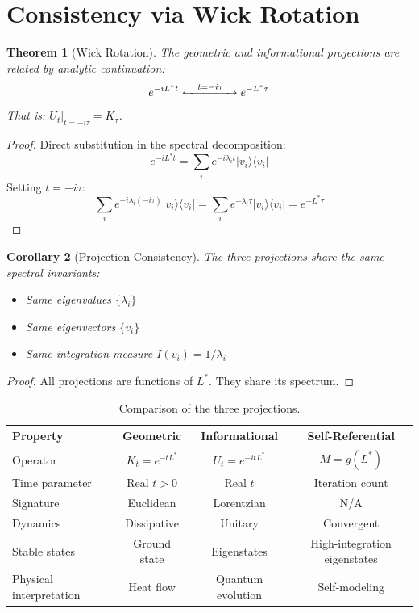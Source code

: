 \documentclass[11pt,a4paper]{article}
\theoremstyle{plain}
\newtheorem{theorem}{Theorem}[section]
\newtheorem{corollary}[theorem]{Corollary}
\theoremstyle{definition}
\theoremstyle{remark}
\newcommand{\Laplacian}{L^*}
\begin{document}
\section{Consistency via Wick Rotation}

\begin{theorem}[Wick Rotation]\label{thm:wick}
The geometric and informational projections are related by analytic continuation:
\begin{equation}
e^{-i\Laplacian t} \xleftrightarrow{\quad t = -i\tau \quad} e^{-\Laplacian \tau}
\end{equation}
That is: $U_t |_{t = -i\tau} = K_\tau$.
\end{theorem}

\begin{proof}
Direct substitution in the spectral decomposition:
\[
e^{-i\Laplacian t} = \sum_i e^{-i\lambda_i t} |v_i\rangle\langle v_i|
\]
Setting $t = -i\tau$:
\[
\sum_i e^{-i\lambda_i (-i\tau)} |v_i\rangle\langle v_i| = \sum_i e^{-\lambda_i \tau} |v_i\rangle\langle v_i| = e^{-\Laplacian \tau}
\]
\end{proof}

\begin{corollary}[Projection Consistency]\label{cor:consistency}
The three projections share the same spectral invariants:
\begin{itemize}[noitemsep]
    \item Same eigenvalues $\{\lambda_i\}$
    \item Same eigenvectors $\{v_i\}$
    \item Same integration measure $I(v_i) = 1/\lambda_i$
\end{itemize}
\end{corollary}

\begin{proof}
All projections are functions of $\Laplacian$. They share its spectrum.
\end{proof}

\begin{table}[h]
\centering
\begin{tabular}{@{}lccc@{}}
\toprule
\textbf{Property} & \textbf{Geometric} & \textbf{Informational} & \textbf{Self-Referential} \\
\midrule
Operator & $K_t = e^{-t\Laplacian}$ & $U_t = e^{-it\Laplacian}$ & $M = g(\Laplacian)$ \\
Time parameter & Real $t > 0$ & Real $t$ & Iteration count \\
Signature & Euclidean & Lorentzian & N/A \\
Dynamics & Dissipative & Unitary & Convergent \\
Stable states & Ground state & Eigenstates & High-integration eigenstates \\
Physical interpretation & Heat flow & Quantum evolution & Self-modeling \\
\bottomrule
\end{tabular}
\caption{Comparison of the three projections.}
\label{tab:projections}
\end{table}
\end{document}
